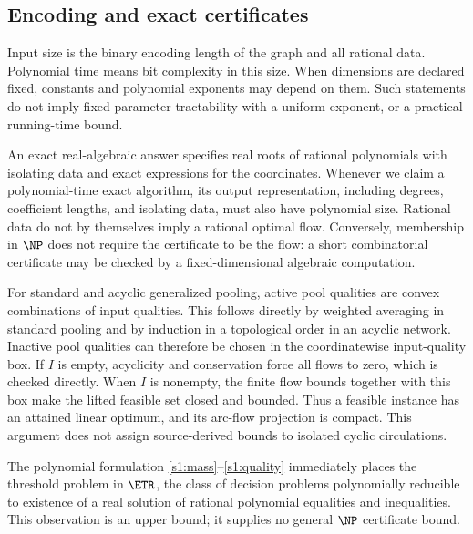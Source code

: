 \subsection{Encoding and exact certificates}\label{s1:encoding}

Input size is the binary encoding length of the graph and all rational
data. Polynomial time means bit complexity in this size. When dimensions
are declared fixed, constants and polynomial exponents may depend on
them. Such statements do not imply fixed-parameter tractability with a
uniform exponent, or a practical running-time bound.

An exact real-algebraic answer specifies real roots of rational
polynomials with isolating data and exact expressions for the coordinates.
Whenever we claim a polynomial-time exact algorithm, its output
representation, including degrees, coefficient lengths, and isolating
data, must also have polynomial size. Rational data do not by themselves
imply a rational optimal flow. Conversely, membership in $\NP$ does not
require the certificate to be the flow: a short combinatorial certificate
may be checked by a fixed-dimensional algebraic computation.

For standard and acyclic generalized pooling, active pool qualities are
convex combinations of input qualities. This follows directly by
weighted averaging in standard pooling and by induction in a topological
order in an acyclic network. Inactive pool qualities can therefore be
chosen in the coordinatewise input-quality box. If $I$ is empty, acyclicity
and conservation force all flows to zero, which is checked directly.
When $I$ is nonempty, the finite flow bounds together with this box make
the lifted feasible set closed and bounded. Thus a feasible instance
has an attained linear optimum, and its arc-flow projection is compact.
This argument does not assign source-derived bounds to isolated cyclic
circulations.

The polynomial formulation \eqref{s1:mass}--\eqref{s1:quality} immediately
places the threshold problem in $\ETR$, the class of decision problems
polynomially reducible to existence of a real solution of rational
polynomial equalities and inequalities. This observation is an upper
bound; it supplies no general $\NP$ certificate bound.

